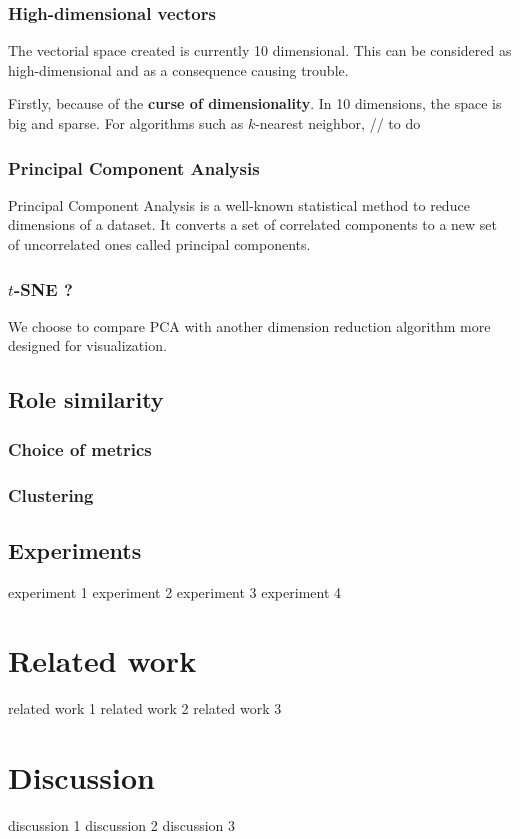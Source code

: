 \documentclass[a4paper,twoside,12pt,openright]{report}
\begin{document}
\subsection{High-dimensional vectors}
The vectorial space created is currently 10 dimensional. This can be considered as high-dimensional and as a consequence causing trouble. 

Firstly, because of the \textbf{curse of dimensionality}. In 10 dimensions, the space is big and sparse. For algorithms such as $k$-nearest neighbor, 
// to do

\subsection{Principal Component Analysis}
Principal Component Analysis is a well-known statistical method to reduce dimensions of a dataset. It converts a set of correlated components to a new set of uncorrelated ones called principal components.


\subsection{$t$-SNE ?}
We choose to compare PCA with another dimension reduction algorithm more designed for visualization.

\newpage

\section{Role similarity}
\subsection{Choice of metrics}
\subsection{Clustering}

\newpage

\section{Experiments}
experiment 1 \newpage
experiment 2 \newpage
experiment 3 \newpage
experiment 4 \newpage

\chapter{Related work}
related work 1 \newpage
related work 2 \newpage
related work 3 \newpage

\chapter{Discussion}
discussion 1 \newpage
discussion 2 \newpage
discussion 3 \newpage



\end{document}
